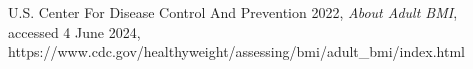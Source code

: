 \documentclass[a4paper, 11pt]{article}
\begin{document}
\begin{multicols}{2}


U.S. Center For Disease Control And Prevention 2022, \textit{About Adult BMI}, accessed 4 June 2024, https://www.cdc.gov/healthyweight/assessing/bmi/adult\_bmi/index.html 

\end{multicols}
\end{document}
